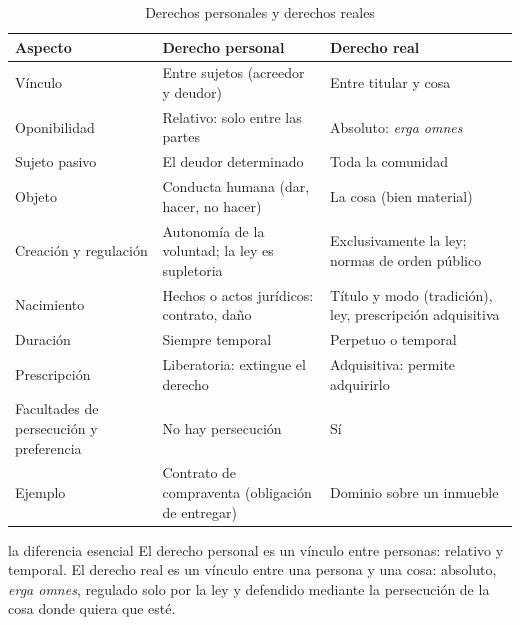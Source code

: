 \documentclass[12pt,oneside]{book}
\begin{document}
\begin{table}[H]
\centering
\small
\begin{tabularx}{\textwidth}{>{\raggedright\arraybackslash}p{}>{\raggedright\arraybackslash}X>{\raggedright\arraybackslash}X}
\toprule
\textbf{Aspecto} & \textbf{Derecho personal} & \textbf{Derecho real} \\
\midrule
Vínculo & Entre sujetos (acreedor y deudor) & Entre titular y cosa \\
Oponibilidad & Relativo: solo entre las partes & Absoluto: \textit{erga omnes} \\
Sujeto pasivo & El deudor determinado & Toda la comunidad \\
Objeto & Conducta humana (dar, hacer, no hacer) & La cosa (bien material) \\
Creación y regulación & Autonomía de la voluntad; la ley es supletoria & Exclusivamente la ley; normas de orden público \\
Nacimiento & Hechos o actos jurídicos: contrato, daño & Título y modo (tradición), ley, prescripción adquisitiva \\
Duración & Siempre temporal & Perpetuo o temporal \\
Prescripción & Liberatoria: extingue el derecho & Adquisitiva: permite adquirirlo \\
Facultades de persecución y preferencia & No hay persecución & Sí \\
Ejemplo & Contrato de compraventa (obligación de entregar) & Dominio sobre un inmueble \\
\bottomrule
\end{tabularx}
\caption{Derechos personales y derechos reales}
\end{table}

\begin{conceptoclave}{la diferencia esencial}
El derecho personal es un vínculo entre personas: relativo y temporal. El derecho real es un vínculo entre una persona y una cosa: absoluto, \textit{erga omnes}, regulado solo por la ley y defendido mediante la persecución de la cosa donde quiera que esté.
\end{conceptoclave}
\end{document}
